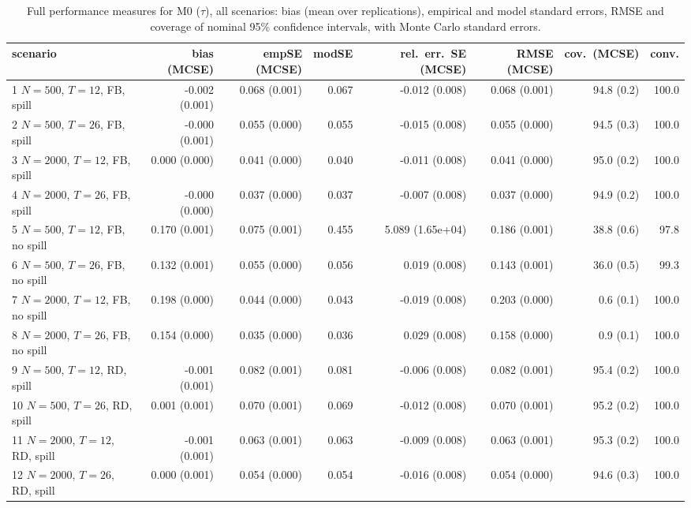 \begin{table}[!t]
\centering
\caption{Full performance measures for M0 ($\tau$), all scenarios: bias (mean over replications), empirical and model standard errors, RMSE and coverage of nominal 95\% confidence intervals, with Monte Carlo standard errors.}
\label{tab:sim-m0-full}
\footnotesize
\setlength{\tabcolsep}{3.5pt}
\begin{adjustbox}{max width=\linewidth}
\begin{tabular}{lrrrrrrr}
\toprule
scenario & bias (MCSE) & empSE (MCSE) & modSE & rel.\ err.\ SE (MCSE) & RMSE (MCSE) & cov.\ (MCSE) & conv. \\
\midrule
1 $N=500$, $T=12$, FB, spill & -0.002 (0.001) & 0.068 (0.001) & 0.067 & -0.012 (0.008) & 0.068 (0.001) & 94.8 (0.2) & 100.0 \\
2 $N=500$, $T=26$, FB, spill & -0.000 (0.001) & 0.055 (0.000) & 0.055 & -0.015 (0.008) & 0.055 (0.000) & 94.5 (0.3) & 100.0 \\
3 $N=2000$, $T=12$, FB, spill & 0.000 (0.000) & 0.041 (0.000) & 0.040 & -0.011 (0.008) & 0.041 (0.000) & 95.0 (0.2) & 100.0 \\
4 $N=2000$, $T=26$, FB, spill & -0.000 (0.000) & 0.037 (0.000) & 0.037 & -0.007 (0.008) & 0.037 (0.000) & 94.9 (0.2) & 100.0 \\
5 $N=500$, $T=12$, FB, no spill & 0.170 (0.001) & 0.075 (0.001) & 0.455 & 5.089 (1.65e+04) & 0.186 (0.001) & 38.8 (0.6) & 97.8 \\
6 $N=500$, $T=26$, FB, no spill & 0.132 (0.001) & 0.055 (0.000) & 0.056 & 0.019 (0.008) & 0.143 (0.001) & 36.0 (0.5) & 99.3 \\
7 $N=2000$, $T=12$, FB, no spill & 0.198 (0.000) & 0.044 (0.000) & 0.043 & -0.019 (0.008) & 0.203 (0.000) & 0.6 (0.1) & 100.0 \\
8 $N=2000$, $T=26$, FB, no spill & 0.154 (0.000) & 0.035 (0.000) & 0.036 & 0.029 (0.008) & 0.158 (0.000) & 0.9 (0.1) & 100.0 \\
9 $N=500$, $T=12$, RD, spill & -0.001 (0.001) & 0.082 (0.001) & 0.081 & -0.006 (0.008) & 0.082 (0.001) & 95.4 (0.2) & 100.0 \\
10 $N=500$, $T=26$, RD, spill & 0.001 (0.001) & 0.070 (0.001) & 0.069 & -0.012 (0.008) & 0.070 (0.001) & 95.2 (0.2) & 100.0 \\
11 $N=2000$, $T=12$, RD, spill & -0.001 (0.001) & 0.063 (0.001) & 0.063 & -0.009 (0.008) & 0.063 (0.001) & 95.3 (0.2) & 100.0 \\
12 $N=2000$, $T=26$, RD, spill & 0.000 (0.001) & 0.054 (0.000) & 0.054 & -0.016 (0.008) & 0.054 (0.000) & 94.6 (0.3) & 100.0 \\

\end{tabular}
\end{adjustbox}
\end{table}
